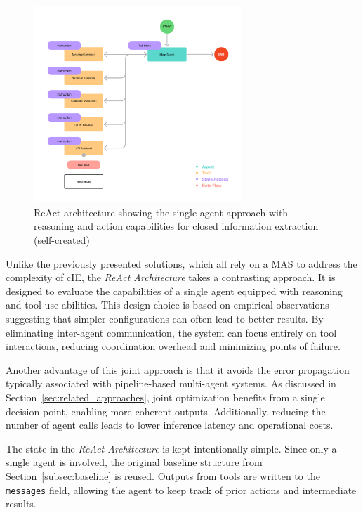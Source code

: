 \documentclass[a4paper,oneside,bibliography=totoc]{scrbook}
\begin{document}
\begin{figure}[tp]
  \centering
  \includegraphics[width=0.7\textwidth]{figures/ReAct Architecture.png}
  \caption[ReAct architecture showing the single-agent approach with reasoning and action capabilities for closed information extraction]{ReAct architecture showing the single-agent approach with reasoning and action capabilities for closed information extraction (self-created)}
  \label{fig:react_architecture}
\end{figure}

Unlike the previously presented solutions, which all rely on a \ac{MAS} to address the complexity of \ac{cIE}, the \textit{ReAct Architecture} takes a contrasting approach. It is designed to evaluate the capabilities of a single agent equipped with reasoning and tool-use abilities. This design choice is based on empirical observations suggesting that simpler configurations can often lead to better results. By eliminating inter-agent communication, the system can focus entirely on tool interactions, reducing coordination overhead and minimizing points of failure.

Another advantage of this joint approach is that it avoids the error propagation typically associated with pipeline-based multi-agent systems. As discussed in Section~\ref{sec:related_approaches}, joint optimization benefits from a single decision point, enabling more coherent outputs. Additionally, reducing the number of agent calls leads to lower inference latency and operational costs.

The state in the \textit{ReAct Architecture} is kept intentionally simple. Since only a single agent is involved, the original baseline structure from Section~\ref{subsec:baseline} is reused. Outputs from tools are written to the \texttt{messages} field, allowing the agent to keep track of prior actions and intermediate results.
\end{document}
